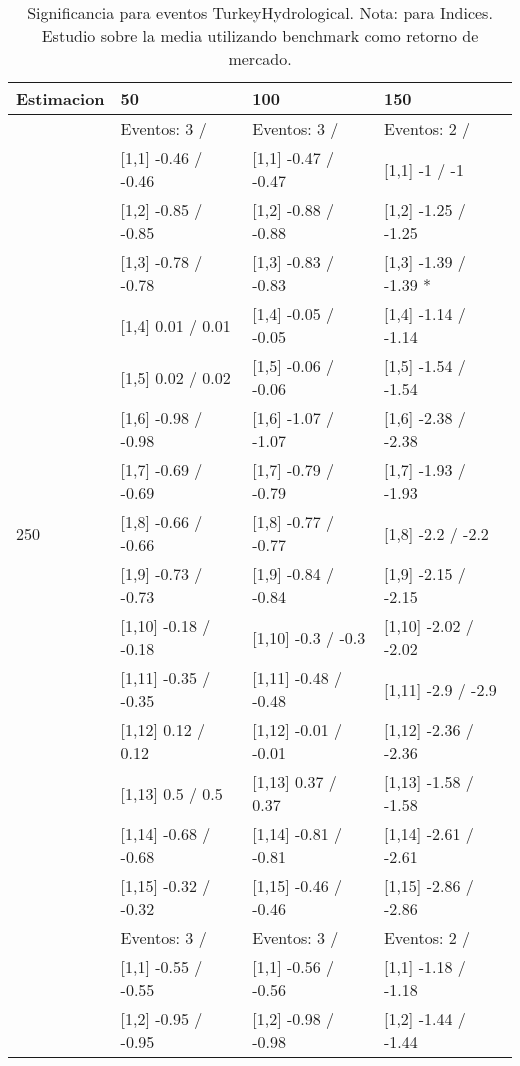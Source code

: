 \begin{table}

\caption{Significancia para eventos TurkeyHydrological. Nota: para Indices. Estudio sobre la media utilizando benchmark como retorno de mercado.}
\centering
\begin{tabular}[t]{llll}
\toprule
Estimacion & 50 & 100 & 150\\
\midrule
 & Eventos:  3 / & Eventos:  3 / & Eventos:  2 /\\
 & {}[1,1] -0.46  / -0.46 & {}[1,1] -0.47  / -0.47 & {}[1,1] -1  / -1\\
 & {}[1,2] -0.85  / -0.85 & {}[1,2] -0.88  / -0.88 & {}[1,2] -1.25  / -1.25\\
 & {}[1,3] -0.78  / -0.78 & {}[1,3] -0.83  / -0.83 & {}[1,3] -1.39  / -1.39 *\\
 & {}[1,4] 0.01  / 0.01 & {}[1,4] -0.05  / -0.05 & {}[1,4] -1.14  / -1.14\\
\addlinespace
 & {}[1,5] 0.02  / 0.02 & {}[1,5] -0.06  / -0.06 & {}[1,5] -1.54  / -1.54\\
 & {}[1,6] -0.98  / -0.98 & {}[1,6] -1.07  / -1.07 & {}[1,6] -2.38  / -2.38\\
 & {}[1,7] -0.69  / -0.69 & {}[1,7] -0.79  / -0.79 & {}[1,7] -1.93  / -1.93\\
250 & {}[1,8] -0.66  / -0.66 & {}[1,8] -0.77  / -0.77 & {}[1,8] -2.2  / -2.2\\
 & {}[1,9] -0.73  / -0.73 & {}[1,9] -0.84  / -0.84 & {}[1,9] -2.15  / -2.15\\
\addlinespace
 & {}[1,10] -0.18  / -0.18 & {}[1,10] -0.3  / -0.3 & {}[1,10] -2.02  / -2.02\\
 & {}[1,11] -0.35  / -0.35 & {}[1,11] -0.48  / -0.48 & {}[1,11] -2.9  / -2.9\\
 & {}[1,12] 0.12  / 0.12 & {}[1,12] -0.01  / -0.01 & {}[1,12] -2.36  / -2.36\\
 & {}[1,13] 0.5  / 0.5 & {}[1,13] 0.37  / 0.37 & {}[1,13] -1.58  / -1.58\\
 & {}[1,14] -0.68  / -0.68 & {}[1,14] -0.81  / -0.81 & {}[1,14] -2.61  / -2.61\\
\addlinespace
 & {}[1,15] -0.32  / -0.32 & {}[1,15] -0.46  / -0.46 & {}[1,15] -2.86  / -2.86\\
 & Eventos:  3 / & Eventos:  3 / & Eventos:  2 /\\
 & {}[1,1] -0.55  / -0.55 & {}[1,1] -0.56  / -0.56 & {}[1,1] -1.18  / -1.18\\
 & {}[1,2] -0.95  / -0.95 & {}[1,2] -0.98  / -0.98 & {}[1,2] -1.44  / -1.44\\

\end{tabular}
\end{table}
